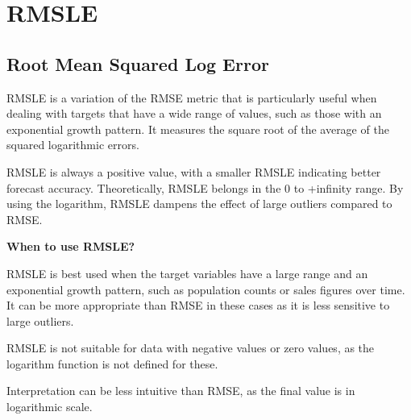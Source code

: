 \clearpage
\thispagestyle{regressionstyle}
\section{RMSLE}
\subsection{Root Mean Squared Log Error}

RMSLE is a variation of the RMSE metric that is particularly useful when dealing with targets that have a wide range of values, such as those with an exponential growth pattern.
It measures the square root of the average of the squared logarithmic errors.

\begin{center}
\end{center}

RMSLE is always a positive value, with a smaller RMSLE indicating better forecast accuracy. Theoretically, RMSLE belongs in the 0 to +infinity range.
By using the logarithm, RMSLE dampens the effect of large outliers compared to RMSE.

\textbf{When to use RMSLE?}

RMSLE is best used when the target variables have a large range and an exponential growth pattern, such as population counts or sales figures over time.
It can be more appropriate than RMSE in these cases as it is less sensitive to large outliers.

{
    \item RMSLE is not suitable for data with negative values or zero values, as the logarithm function is not defined for these.
    \item Interpretation can be less intuitive than RMSE, as the final value is in logarithmic scale.
}

